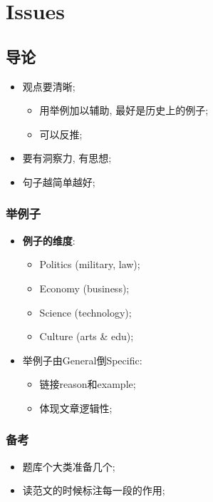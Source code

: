 \chapter{Issues}

\section{导论}

  \begin{itemize}
    \item 观点要清晰;
    \begin{itemize}
      \item 用举例加以辅助, 最好是历史上的例子;
      \item 可以反推;
    \end{itemize}

    \item 要有洞察力, 有思想;
    \item 句子越简单越好;
  \end{itemize}

  \subsection{举例子}

    \begin{itemize}
      \item \textbf{例子的维度}:
      \begin{itemize}
        \item Politics (military, law);
        \item Economy (business);
        \item Science (technology);
        \item Culture (arts \& edu);
      \end{itemize}

      \item 举例子由General倒Specific:
      \begin{itemize}
        \item 链接reason和example;
        \item 体现文章逻辑性;
      \end{itemize}
    \end{itemize}

  \subsection{备考}

    \begin{itemize}
      \item 题库个大类准备几个;
      \item 读范文的时候标注每一段的作用;
    \end{itemize}

